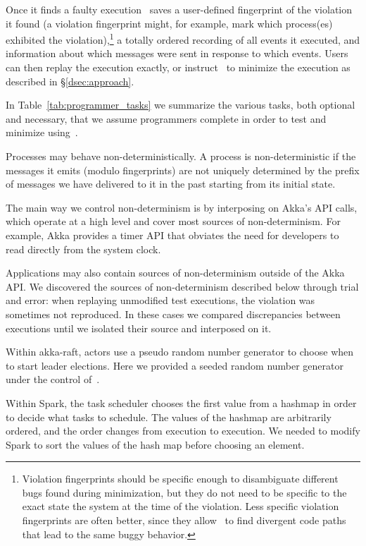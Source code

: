 Once it finds a faulty execution \sys~saves a user-defined fingerprint of the violation it
found (a violation fingerprint might, for example, mark which process(es)
exhibited the violation),\footnote{Violation fingerprints should
be specific enough to disambiguate different bugs found during minimization, but they do not need to be specific to
the exact state the system at the time of the violation. Less
specific violation fingerprints are often better, since they allow \sys~to
find divergent code paths that lead to the same buggy behavior.}
a totally ordered recording of all events it
executed, and information about which messages were sent in
response to which events. Users can then replay the execution exactly, or
instruct \sys~to minimize the execution as described in \S\ref{dsec:approach}.

In Table~\ref{tab:programmer_tasks} we summarize the various tasks, both
optional and necessary, that we assume programmers
complete in order to test and minimize using~\sys.

 Processes may behave non-deterministically.
A process is non-deterministic if the messages it emits
(modulo fingerprints) are not uniquely determined by the prefix of messages we have
delivered to it in the past starting from its initial state.

The main way we control non-determinism is by interposing on Akka's API calls,
which operate at a high level and cover most sources of non-determinism.
For example, Akka provides a timer API that
obviates the need for developers to read directly from the system clock.

Applications may also contain sources of non-determinism outside of the Akka
API. We discovered the sources of non-determinism described below through trial and
error: when replaying unmodified test executions, the violation was sometimes not
reproduced. In these cases we compared discrepancies between executions until we
isolated their source and interposed on it.

 Within akka-raft, actors use a
pseudo random number generator to choose when to
start leader elections. Here we provided a seeded random
number generator under the control of~\sys.

 Within Spark, the task scheduler chooses the first value from a hashmap in order
to decide what tasks to schedule. The values of the hashmap are
arbitrarily ordered, and the order changes from execution to execution. We needed to modify
Spark to sort the values of the hash map before choosing an element.

